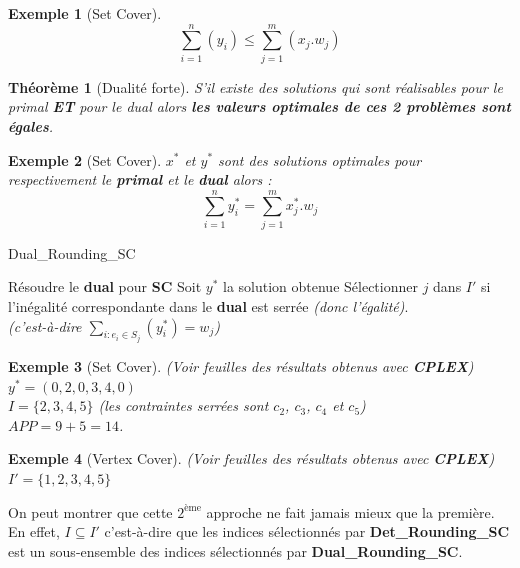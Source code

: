 \documentclass[12pt]{article}
\newcommand{\titre}[1]{\textcolor{title}{#1}}
\newtheorem{exemple}{Exemple}[section]
\newtheorem{thm}{Th\'eor\`eme}[section]
\begin{document}
\begin{exemple}[Set Cover]
$$\sum_{i=1}^n(y_i) \leq \sum^m_{j=1} (x_j.w_j)$$
\end{exemple}

\begin{thm}[\titre{Dualité forte}] S'il existe des solutions qui sont
réalisables pour le primal \textbf{ET} pour le dual alors \textbf{les valeurs
optimales de ces 2 problèmes sont égales}.
\end{thm}

\begin{exemple}[Set Cover]
$x^*$ et $y^*$ sont des solutions optimales pour respectivement le
\textbf{primal} et le \textbf{dual} alors :
$$ \sum_{i=1}^n y^*_i = \sum_{j=1}^m x^*_j.w_j$$
\end{exemple}

\begin{algorithm}[H]
\caption{Dual\_Rounding\_SC}
\begin{algorithmic}[1]
\STATE Résoudre le \textbf{dual} pour \textbf{\titre{SC}}
\STATE Soit $y^*$ la solution obtenue
\STATE Sélectionner $j$ dans $I'$ si l'inégalité correspondante dans le
\textbf{dual} est serrée \textit{(donc l'égalité)}.\\
\textit{(c'est-à-dire $\sum_{i : e_i \in S_j} (y^*_i) = w_j$)}
\end{algorithmic}
\end{algorithm}

\begin{exemple}[Set Cover] (Voir feuilles des résultats obtenus avec
\textbf{CPLEX}) \\
$y^* = (0,2,0,3,4,0)$ \\
$I = \{2,3,4,5\}$ (les contraintes serrées sont $c_2$, $c_3$, $c_4$ et $c_5$)\\
$APP=9+5=14$.
\end{exemple}

\begin{exemple}[Vertex Cover] (Voir feuilles des résultats obtenus avec
\textbf{CPLEX}) \\
$I' = \{1,2,3,4,5\}$
\end{exemple}

On peut montrer que cette $2^{\text{ème}}$ approche ne fait jamais mieux que la
première. En effet, $I \subseteq I'$ c'est-à-dire que les indices sélectionnés
par \textbf{Det\_Rounding\_SC} est un sous-ensemble des indices sélectionnés par
\textbf{Dual\_Rounding\_SC}.
\end{document}

